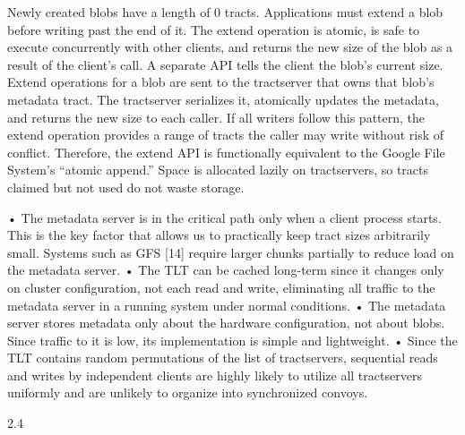 Newly created blobs have a length of 0 tracts. Applications must extend a blob before writing past the end
of it. The extend operation is atomic, is safe to execute
concurrently with other clients, and returns the new size
of the blob as a result of the client’s call. A separate API
tells the client the blob’s current size. Extend operations
for a blob are sent to the tractserver that owns that blob’s
metadata tract. The tractserver serializes it, atomically
updates the metadata, and returns the new size to each
caller. If all writers follow this pattern, the extend operation provides a range of tracts the caller may write without risk of conflict. Therefore, the extend API is functionally equivalent to the Google File System’s “atomic
append.” Space is allocated lazily on tractservers, so
tracts claimed but not used do not waste storage.

• The metadata server is in the critical path only when
a client process starts. This is the key factor that
allows us to practically keep tract sizes arbitrarily
small. Systems such as GFS [14] require larger
chunks partially to reduce load on the metadata
server.
• The TLT can be cached long-term since it changes
only on cluster configuration, not each read and
write, eliminating all traffic to the metadata server
in a running system under normal conditions.
• The metadata server stores metadata only about the
hardware configuration, not about blobs. Since traffic to it is low, its implementation is simple and
lightweight.
• Since the TLT contains random permutations of the
list of tractservers, sequential reads and writes by
independent clients are highly likely to utilize all
tractservers uniformly and are unlikely to organize
into synchronized convoys.

2.4

